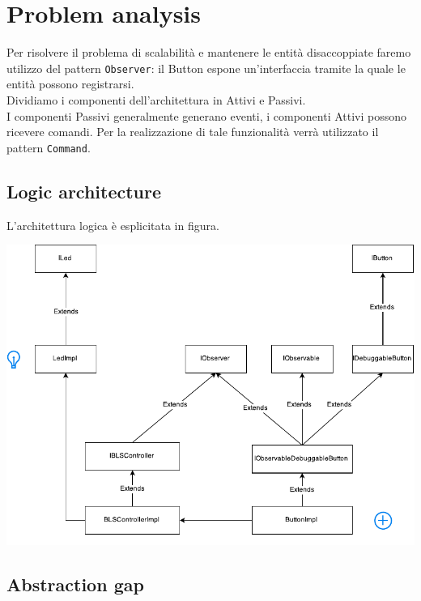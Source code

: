 \documentclass{llncs}
\newcommand{\labelsec}[1]{\label{sec:#1}}
\begin{document}
\section{Problem analysis}
\labelsec{ProblemAnalysis}
Per risolvere il problema di scalabilit\`a e mantenere le entit\`a disaccoppiate faremo utilizzo del pattern \texttt{Observer}: il Button espone un'interfaccia tramite la quale le entit\`a possono registrarsi.\\
Dividiamo i componenti dell'architettura in Attivi e Passivi.\\
I componenti Passivi generalmente generano eventi, i componenti Attivi possono ricevere comandi. Per la realizzazione di tale funzionalit\`a verr\`a utilizzato il pattern \texttt{Command}.\\
\subsection{Logic architecture}
L'architettura logica \`e esplicitata in figura.
\begin{center}
\includegraphics{img/graphs/Analisi_BLS.pdf}
\end{center}
\begin{center}

\end{center}

\subsection{Abstraction gap}
\end{document}
